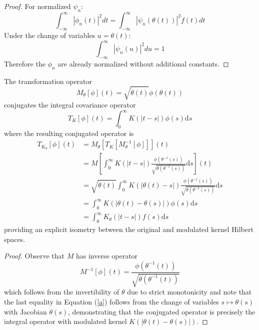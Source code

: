 \documentclass{mc}
\newcommand{\mathd}{\mathrm{d}}
\begin{document}
\begin{proof}
  For normalized $\psi_n$:
  \begin{equation}
    \int_{- \infty}^{\infty} | \phi_n (t) |^2 dt = \int_{- \infty}^{\infty} |
    \psi_n (\theta (t)) |^2 \dot{f} (t) dt
  \end{equation}
  Under the change of variables $u = \theta (t)$:
  \begin{equation}
    \int_{- \infty}^{\infty} | \psi_n (u) |^2 du = 1
  \end{equation}
  Therefore the $\phi_n$ are already normalized without additional constants.
\end{proof}

\begin{theorem}
  The transformation operator
  \begin{equation}
    M_{\theta} [\phi] (t) = \sqrt{\dot{\theta} (t)} \phi (\theta (t))
  \end{equation}
  conjugates the integral covariance operator
  \begin{equation}
    T_K [\phi] (t) = \int_0^{\infty} K (|t - s|) \phi (s) \mathd s
  \end{equation}
  where the resulting conjugated operator is
  \begin{equation}
    \begin{array}{ll}
      T_{K_{\theta}}  [\phi] (t) & {= M_{\theta}}  [T_K [M_{\theta}^{- 1}
      [\phi]]] (t)\\
      & = M \left[ \int_0^{\infty} K (|t - s|) \frac{\phi (\theta^{- 1}
      (s))}{\sqrt{\dot{\theta} (\theta^{- 1} (s))}} \mathd s \right] (t)\\
      & = \sqrt{\dot{\theta} (t)}  \int_0^{\infty} K (| \theta (t) - s|)
      \frac{\phi (\theta^{- 1} (s))}{\sqrt{\dot{\theta} (\theta^{- 1} (s))}}
      \mathd s\\
      & = \int_0^{\infty} K (| \theta (t) - \theta (s) |) \phi (s) \mathd s\\
      & = \int_0^{\infty} K_{\theta} (| t - s |) f (s) \mathd s
    \end{array} \label{a}
  \end{equation}
  providing an explicit isometry between the original and modulated kernel
  Hilbert spaces.
\end{theorem}

\begin{proof}
  Observe that $M$ has inverse operator
  \begin{equation}
    M^{- 1} [\phi] (t) = \frac{\phi (\theta^{- 1} (t))}{\sqrt{\dot{\theta}
    (\theta^{- 1} (t))}}
  \end{equation}
  which follows from the invertibility of $\theta$ due to strict monotonicity
  and note that the last equality in Equation (\ref{a}) follows from the
  change of variables $s \mapsto \theta (s)$ with Jacobian $\dot{\theta} (s)$,
  demonstrating that the conjugated operator is precisely the integral
  operator with modulated kernel $K (| \theta (t) - \theta (s) |)$.
\end{proof}
\end{document}
